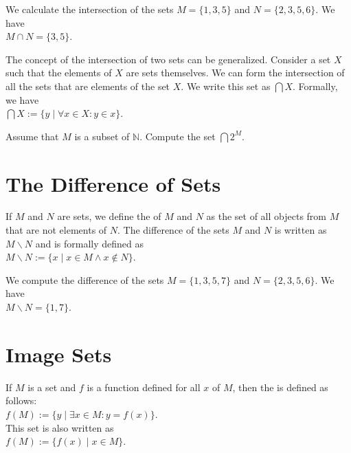 \exampleEng
We calculate the intersection of the sets $M = \{ 1, 3, 5 \}$ and $N = \{ 2, 3, 5, 6 \}$.  We have
\\[0.2cm]
\hspace*{1.3cm} $M \cap N = \{ 3, 5 \}$.
\eox
\vspace*{0.2cm}

The concept of the intersection of two sets can be generalized.  Consider
a set $X$ such that the elements of $X$ are sets themselves. 
We can form the intersection of all the 
sets that are elements of the set $X$.  We write this set as $\bigcap X$.  Formally,
we have
\\[0.2cm]
\hspace*{1.3cm} 
$\bigcap X := \{ y \;|\; \forall x \in X: y \in x \}$.
\vspace*{0.2cm}

\exerciseEng
Assume that $M$ is a subset of $\mathbb{N}$.  Compute the set $\bigcap 2^M$.
\eox

\section{The Difference of Sets}
If $M$ and $N$ are sets, we define the 
of $M$ and $N$ as the set of all objects from $M$ that are not elements of $N$.  The difference of the sets $M$
and $N$ is written as $M\backslash N$ and is formally defined as
 \\[0.2cm]
\hspace*{1.3cm} $M \backslash N := \{ x \mid x \in M \wedge x \not\in N \}$.

\exampleEng
We compute the difference of the sets $M = \{ 1, 3, 5, 7 \}$ and $N = \{ 2, 3, 5, 6 \}$.  We have
\\[0.2cm]
\hspace*{1.3cm} $M \backslash N = \{ 1, 7 \}$. \eox

\section{Image Sets}
If $M$ is a set and $f$ is a function defined for all $x$ of $M$, then the 
is defined as follows:
\\[0.2cm]
\hspace*{1.3cm}
$f(M) := \{ y \;|\; \exists x \in M: y = f(x) \}$. 
\\[0.2cm]
This set is also written as
\\[0.2cm]
\hspace*{1.3cm}
$f(M) := \bigl\{ f(x) \;|\; x \in M \}$. 

